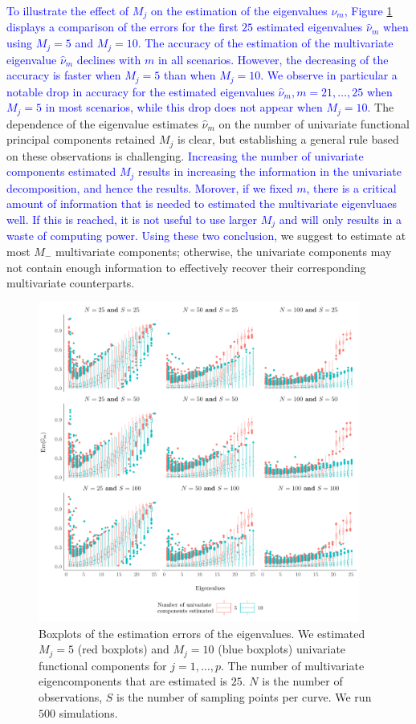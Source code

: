 \textcolor{blue}{To illustrate the effect of $M_j$ on the estimation of the eigenvalues $\nu_m$, Figure \ref{fig:ncomp} displays a comparison of the errors for the first $25$ estimated eigenvalues $\widehat{\nu}_m$ when using $M_j = 5$ and $M_j = 10$. The accuracy of the estimation of the multivariate eigenvalue $\widehat{\nu}_m$ declines with $m$ in all scenarios. However, the decreasing of the accuracy is faster when $M_j = 5$ than when $M_j = 10$. We observe in particular a notable drop in accuracy for the estimated eigenvalues $\widehat{\nu}_m, m = 21, \dots, 25$ when $M_j = 5$ in most scenarios, while this drop does not appear when $M_j = 10$.} The dependence of the eigenvalue estimates $\widehat{\nu}_m$ on the number of univariate functional principal components retained $M_j$ is clear, but establishing a general rule based on these observations is challenging. \textcolor{blue}{Increasing the number of univariate components estimated $M_j$ results in increasing the information in the univariate decomposition, and hence the results. Morover, if we fixed $m$, there is a critical amount of information that is needed to estimated the multivariate eigenvluaes well. If this is reached, it is not useful to use larger $M_j$ and will only results in a waste of computing power. Using these two conclusion,} we suggest to estimate at most $M_{-}$ multivariate components; otherwise, the univariate components may not contain enough information to effectively recover their corresponding multivariate counterparts.
\begin{figure}
     \centering
    \includegraphics[width=0.94\textwidth]{figures/ncomp.pdf}
    \caption{Boxplots of the estimation errors of the eigenvalues. We estimated $M_j = 5$ (red boxplots) and $M_j = 10$ (blue boxplots) univariate functional components for $j = 1, \dots, p$. The number of multivariate eigencomponents that are estimated is $25$. $N$ is the number of observations, $S$ is the number of sampling points per curve. We run $500$ simulations.}
    \label{fig:ncomp}
\end{figure}

